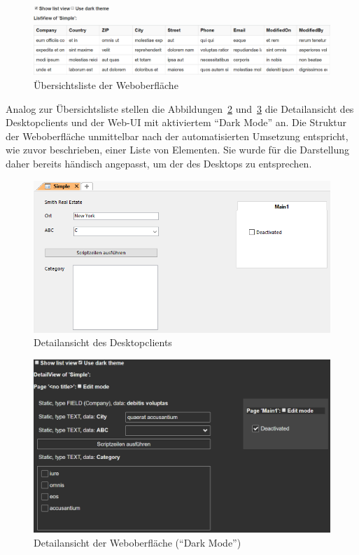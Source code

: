 \begin{figure}
    \centering
    \captionsetup{justification=centering}
    \includegraphics[width=\textwidth]{figures/listview_new.png}
        \caption{Übersichtsliste der Weboberfläche}\label{fig:listview_new}
\end{figure}

Analog zur Übersichtsliste stellen die Abbildungen~\ref{fig:detailview_crm} und~\ref{fig:detailview_new} die Detailansicht des Desktopclients und der Web-UI mit aktiviertem \enquote{Dark Mode} an. Die Struktur der Weboberfläche unmittelbar nach der automatisierten Umsetzung entspricht, wie zuvor beschrieben, einer Liste von Elementen. Sie wurde für die Darstellung daher bereits händisch angepasst, um der des Desktops zu entsprechen.

\begin{figure}
    \centering
    \captionsetup{justification=centering}
    \includegraphics[width=\textwidth]{figures/detailview_crm.png}
        \caption{Detailansicht des Desktopclients}\label{fig:detailview_crm}
\end{figure}

\begin{figure}
    \centering
    \captionsetup{justification=centering}
    \includegraphics[width=\textwidth]{figures/detailview_new.png}
        \caption{Detailansicht der Weboberfläche (\enquote{Dark Mode})}\label{fig:detailview_new}
\end{figure}

